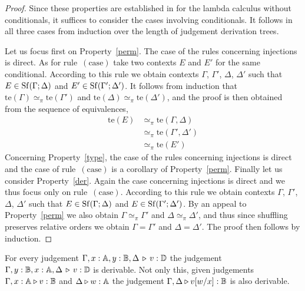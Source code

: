 \begin{proof}
Since these properties are established in \cite[Theorem 2.3]{dahlqvist2023complete} for the lambda calculus without conditionals,  it suffices to consider the cases involving conditionals.
It follows in all three cases from induction over the length of judgement derivation
trees. 

Let us focus first on Property~\eqref{perm}. The case of the rules concerning
injections is direct. As for rule~$(\text{case})$ take two contexts $E$ and
$E'$ for the same conditional. According to this rule we obtain contexts
$\Gamma$, $\Gamma'$, $\Delta$, $\Delta'$ such that $E \in
\mathrm{Sf}(\Gamma;\Delta)$ and $E' \in \mathrm{Sf}(\Gamma';\Delta')$. It follows from
induction that  $\text{te}(\Gamma) \simeq_\pi \text{te}(\Gamma')$ and $\text{te}(\Delta) \simeq_\pi \text{te}(\Delta')$,
and the proof is then obtained from the sequence of equivalences,
\begin{align*}
        \text{te}(E) & \simeq_\pi \text{te}(\Gamma, \Delta) 
        \\
        & \simeq_\pi \text{te}(\Gamma', \Delta')
        \\
        & \simeq_\pi \text{te}(E')
\end{align*}
Concerning Property~\eqref{type}, the case of the rules concerning injections
is direct and the case of rule~$(\text{case})$ is a corollary of
Property~\eqref{perm}. Finally let us consider Property~\eqref{der}. Again the
case concerning injections is direct and we thus focus only on
rule~$(\text{case})$. According to this rule we obtain contexts $\Gamma$,
$\Gamma'$, $\Delta$, $\Delta'$ such that $E \in \mathrm{Sf}(\Gamma;\Delta)$ and $E
\in \mathrm{Sf}(\Gamma';\Delta')$. By an appeal to Property~\eqref{perm} we also
obtain $\Gamma \simeq_\pi \Gamma'$ and $\Delta \simeq_\pi \Delta'$, and thus
since shuffling preserves relative orders we obtain $\Gamma = \Gamma'$ and
$\Delta = \Delta'$. The proof then follows by induction.
\end{proof}


\begin{lemma}
\label{lem:exh_and_sub} 
For every judgement $\Gamma,x: \mathbb{A}, y: \mathbb{B}, \Delta \, \triangleright \, v: \mathbb{D}$ the
judgement $\Gamma, y:\mathbb{B}, x:\mathbb{A}, \Delta \, \triangleright \, v:
\mathbb{D}$ is derivable. Not only this, given judgements  $\Gamma,x:\mathbb{A} \triangleright
v: \mathbb{B}$ and $\Delta \triangleright w: \mathbb{A}$ the judgement $\Gamma, \Delta \triangleright
v[w/x]: \mathbb{B}$ is also derivable.
\end{lemma}

